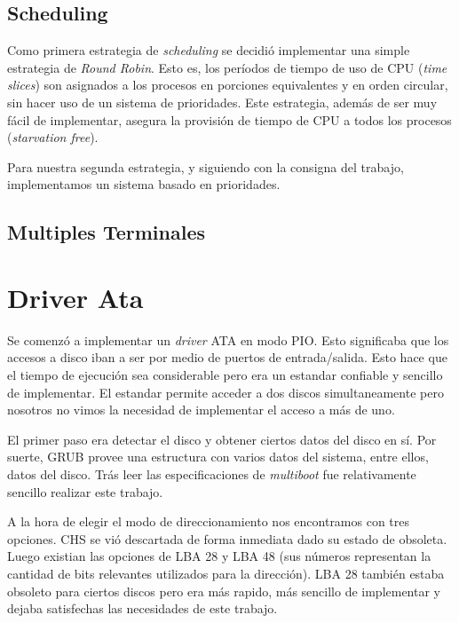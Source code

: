 \documentclass[a4paper,10pt]{article}
\begin{document}
    \subsection{Scheduling}
    Como primera estrategia de \textit{scheduling} se decidió implementar una simple estrategia de \textit{Round Robin}.
    Esto es, los períodos de tiempo de uso de CPU (\textit{time slices}) son asignados a los procesos en porciones 
    equivalentes y en orden circular, sin hacer uso de un sistema de prioridades. Este estrategia, además de ser muy 
    fácil de implementar, asegura la provisión de tiempo de CPU a todos los procesos (\textit{starvation free}).

    Para nuestra segunda estrategia, y siguiendo con la consigna del trabajo, implementamos un sistema basado en 
    prioridades. 

    \subsection{Multiples Terminales}
\newpage
\section{Driver Ata}
    Se comenzó a implementar un \textit{driver} ATA en modo PIO. Esto significaba que los accesos a disco iban a ser
    por medio de puertos de entrada/salida. Esto hace que el tiempo de ejecución sea considerable pero era un estandar
    confiable y sencillo de implementar.
    El estandar permite acceder a dos discos simultaneamente pero nosotros no vimos la necesidad de implementar el 
    acceso a más de uno.
    
    El primer paso era detectar el disco y obtener ciertos datos del disco en sí. Por suerte, GRUB provee una estructura
    con varios datos del sistema, entre ellos, datos del disco. Trás leer las especificaciones de \textit{multiboot}
    fue relativamente sencillo realizar este trabajo.

    A la hora de elegir el modo de direccionamiento nos encontramos con tres opciones. CHS se vió descartada de forma
    inmediata dado su estado de obsoleta. Luego existian las opciones de LBA 28 y LBA 48 (sus números representan
    la cantidad de bits relevantes utilizados para la dirección). LBA 28 también estaba obsoleto para ciertos discos
    pero era más rapido, más sencillo de implementar y dejaba satisfechas las necesidades de este trabajo.
\end{document}
